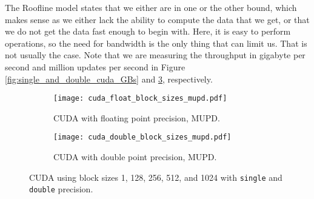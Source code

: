 \documentclass[10pt]{article}
\begin{document}
The Roofline model states that we either are in one or the other bound, which makes sense as we either lack the ability to compute the data that we get, or that we do not get the data fast enough to begin with. Here, it is easy to perform operations, so the need for bandwidth is the only thing that can limit us. That is not usually the case. Note that we are measuring the throughput in gigabyte per second and million updates per second in Figure \ref{fig:single_and_double_cuda_GBs} and \ref{fig:single_and_double_cuda_MUPD}, respectively.
\begin{figure}[H]
    \centering
    \begin{subfigure}[b]{0.49\textwidth}
        \centering
        \texttt{[image: cuda\_float\_block\_sizes\_mupd.pdf]}
        \caption{CUDA with floating point precision, MUPD.}
        \label{fig:cuda_float_MUPD}
    \end{subfigure}\hfill
    \begin{subfigure}[b]{0.49\textwidth}
        \centering
        \texttt{[image: cuda\_double\_block\_sizes\_mupd.pdf]}
        \caption{CUDA with double point precision, MUPD.}
        \label{fig:cuda_double_MUPD}
    \end{subfigure}\hfill
    \caption{CUDA using block sizes 1, 128, 256,  512, and 1024 with \texttt{single} and \texttt{double} precision.}
    \label{fig:single_and_double_cuda_MUPD}
\end{figure}
\end{document}
